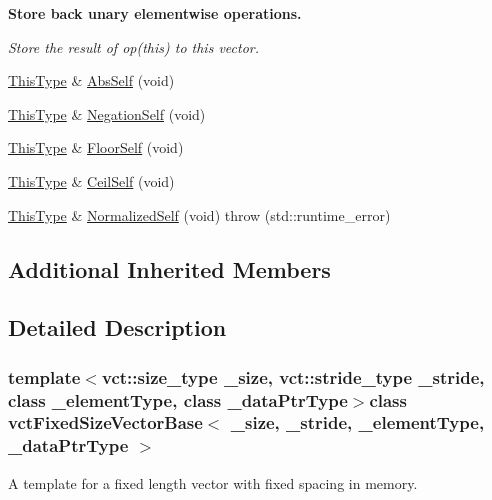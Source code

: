 \begin{Indent}{\bf Store back unary elementwise operations.}\par
{\em Store the result of op(this) to this vector. }\begin{DoxyCompactItemize}
\item 
\hyperlink{classvct_fixed_size_const_vector_base_a071063bc4fa43112cc287b2dbef53180}{This\+Type} \& \hyperlink{classvct_fixed_size_vector_base_acbdf50a6d67bfe155fa82f9b6061c6a5}{Abs\+Self} (void)
\item 
\hyperlink{classvct_fixed_size_const_vector_base_a071063bc4fa43112cc287b2dbef53180}{This\+Type} \& \hyperlink{classvct_fixed_size_vector_base_a5577761b2afff05b1e5bcb49c272d8d6}{Negation\+Self} (void)
\item 
\hyperlink{classvct_fixed_size_const_vector_base_a071063bc4fa43112cc287b2dbef53180}{This\+Type} \& \hyperlink{classvct_fixed_size_vector_base_adc23d443a899f5eaa0351e239fe6e7e0}{Floor\+Self} (void)
\item 
\hyperlink{classvct_fixed_size_const_vector_base_a071063bc4fa43112cc287b2dbef53180}{This\+Type} \& \hyperlink{classvct_fixed_size_vector_base_ac454fa176e22b7f6cc9d50e193004484}{Ceil\+Self} (void)
\item 
\hyperlink{classvct_fixed_size_const_vector_base_a071063bc4fa43112cc287b2dbef53180}{This\+Type} \& \hyperlink{classvct_fixed_size_vector_base_a3e90a135520a329e4168edec3d7dc3d8}{Normalized\+Self} (void)  throw (std\+::runtime\+\_\+error)
\end{DoxyCompactItemize}
\end{Indent}
\subsection*{Additional Inherited Members}


\subsection{Detailed Description}
\subsubsection*{template$<$vct\+::size\+\_\+type \+\_\+size, vct\+::stride\+\_\+type \+\_\+stride, class \+\_\+element\+Type, class \+\_\+data\+Ptr\+Type$>$class vct\+Fixed\+Size\+Vector\+Base$<$ \+\_\+size, \+\_\+stride, \+\_\+element\+Type, \+\_\+data\+Ptr\+Type $>$}

A template for a fixed length vector with fixed spacing in memory. 


